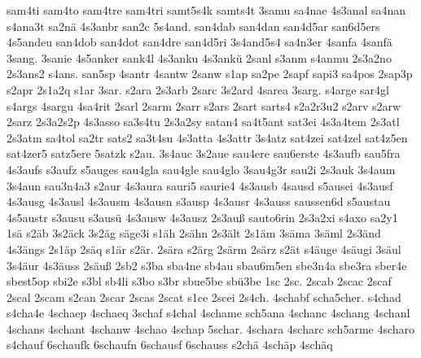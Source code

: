 {    sam4ti
    sam4to
    sam4tre
    sam4tri
    samt5s4k
    samts4t
    3samu
    sa4nae
    4s3anal
    sa4nan
    s4ana3t
    sa2nä
    4s3anbr
    san2c
    5s4and.
    san4dab
    san4dan
    san4d5ar
    san6d5ers
    4s5andeu
    san4dob
    san4dot
    san4dre
    san4d5ri
    3s4and5s4
    sa4n3er
    4sanfa
    4sanfä
    3sang.
    3sanie
    4s5anker
    sank4l
    4s3anku
    4s3ankü
    2sanl
    s3anm
    s4anmu
    2s3a2no
    2s3ans2
    s4ans.
    san5sp
    4santr
    4santw
    2sanw
    s1ap
    sa2pe
    2sapf
    sapi3
    sa4pos
    2sap3p
    s2apr
    2s1a2q
    s1ar
    3sar.
    s2ara
    2s3arb
    2sarc
    3s2ard
    4sarea
    3sarg.
    s4arge
    sar4gl
    s4args
    4sargu
    4sa4rit
    2sarl
    2sarm
    2sarr
    s2ars
    2sart
    sarts4
    s2a2r3u2
    s2arv
    s2arw
    2sarz
    2s3a2s2p
    4s3asso
    sa3s4tu
    2s3a2sy
    satan4
    sa4t5ant
    sat3ei
    4s3a4tem
    2s3atl
    2s3atm
    sa4tol
    sa2tr
    sats2
    sa3t4su
    4s3atta
    4s3attr
    3s4atz
    sat4zei
    sat4zel
    sat4z5en
    sat4zer5
    satz5ere
    5satzk
    s2au.
    3s4auc
    3s2aue
    sau4ere
    sau6erste
    4s3aufb
    sau5fra
    4s3aufs
    s3aufz
    s5auges
    sau4gla
    sau4gle
    sau4glo
    3sau4g3r
    sau2i
    2s3auk
    3s4aum
    3s4aun
    sau3n4a3
    s2aur
    4s3aura
    sauri5
    saurie4
    4s3ausb
    4sausd
    s5ausei
    4s3ausf
    4s3ausg
    4s3ausl
    4s3ausm
    4s3ausn
    s3ausp
    4s3ausr
    4s3auss
    saussen6d
    s5austau
    4s5austr
    s3ausu
    s3ausü
    4s3ausw
    4s3ausz
    2s3auß
    sauto6rin
    2s3a2xi
    s4axo
    sa2y1
    1sä
    s2äb
    3s2äck
    3s2äg
    säge3i
    s1äh
    2sähn
    2s3ält
    2s1äm
    3säma
    3säml
    2s3änd
    4s3ängs
    2s1äp
    2säq
    s1är
    s2är.
    2sära
    s2ärg
    2särm
    2särz
    s2ät
    s4äuge
    4säugi
    3säul
    3s4äur
    4s3äuss
    2säuß
    2sb2
    s3ba
    sba4ne
    sb4au
    sbau6m5en
    sbe3n4a
    sbe3ra
    sber4e
    sbest5op
    sbi2e
    s3bl
    sb4li
    s3bo
    s3br
    sbue5be
    sbü3be
    1sc
    2sc.
    2scab
    2scac
    2scaf
    2scal
    2scam
    s2can
    2scar
    2scas
    2scat
    s1ce
    2scei
    2s4ch.
    4schabf
    scha5cher.
    s4chad
    s4cha4e
    4schaep
    4schaeq
    3schaf
    s4chal
    4schame
    sch5ana
    4schanc
    4schang
    4schanl
    4schans
    4schant
    4schanw
    4schao
    4schap
    5schar.
    4schara
    4scharc
    sch5arme
    4scharo
    s4chauf
    6schaufk
    6schaufn
    6schausf
    6schauss
    s2chä
    4schäp
    4schäq
}
